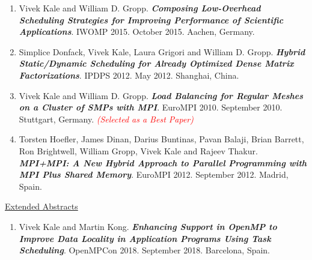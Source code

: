 \begin{enumerate}
\item Vivek Kale and William D. Gropp. \textbf{\textit{Composing Low-Overhead Scheduling Strategies for Improving Performance of Scientific Applications}}. IWOMP 2015. October 2015. Aachen, Germany.
\item Simplice Donfack, Vivek Kale, Laura Grigori and William D. Gropp. \textbf{\textit{Hybrid Static/Dynamic Scheduling for Already Optimized Dense Matrix Factorizations}}. IPDPS 2012. May 2012. Shanghai, China.
\item Vivek Kale and William D. Gropp. \textbf{\textit{Load Balancing for Regular Meshes on a Cluster of SMPs with MPI}}. EuroMPI 2010. September 2010. Stuttgart, Germany. \textit{\textcolor{red}{(Selected as a Best Paper)}}
\item Torsten Hoefler, James Dinan, Darius Buntinas, Pavan Balaji, Brian Barrett, Ron Brightwell, William Gropp, Vivek Kale and Rajeev Thakur. \textbf{\textit{MPI+MPI: A New Hybrid Approach to Parallel Programming with MPI Plus Shared Memory}}. EuroMPI 2012. September 2012. Madrid, Spain.
\end{enumerate} 

\underline{Extended Abstracts}
\vspace*{-0.05in}
\begin{enumerate}
\item Vivek Kale and Martin Kong. \textbf{\textit{Enhancing Support in OpenMP to Improve Data Locality in Application Programs Using Task Scheduling}}. OpenMPCon 2018. September 2018. Barcelona, Spain.
\end{enumerate}

